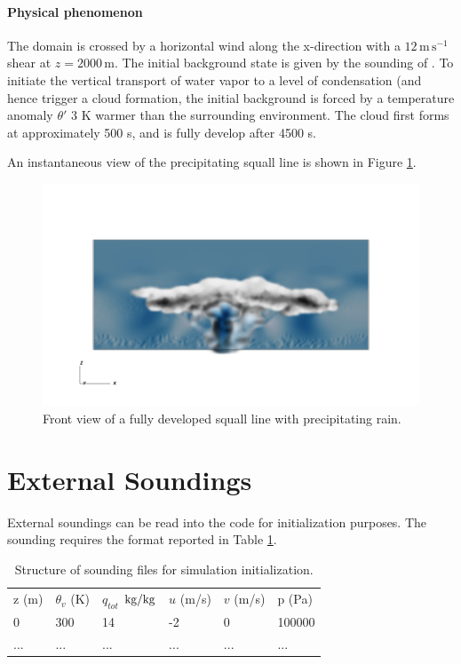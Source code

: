 \documentclass{report}
\begin{document}
\paragraph{Physical phenomenon}
The domain is crossed by a horizontal wind along the x-direction with a $12\,\mathrm{m\,s^{-1}}$ shear at $z=2000\,\mathrm{m}$.
The initial background state is given by the sounding of \cite{gabersekGiraldoDoyle2012}.
To initiate the vertical transport of water vapor to a level of condensation (and hence trigger a cloud formation, the initial background is forced by a temperature anomaly $\theta'$ $3$ K warmer than the surrounding environment. The cloud first forms at approximately 500 s, and is fully develop after 4500 s. 

An instantaneous view of the precipitating squall line is shown in Figure \ref{fig:benchmarks/squall1}. 

\begin{figure}[htbp]
\includegraphics[width=1.2\textwidth]{figures/squall_working_warm_rain_frontal_view0028.png}
\caption{Front view of a fully developed squall line with precipitating rain. }
\label{fig:benchmarks/squall1}
\end{figure}

\section{External Soundings}
External soundings can be read into the code for initialization purposes. The sounding requires the format reported in Table \ref{tab:DeltaDefinitionsTable}.

\begin{table}[t]
\centering
{\footnotesize
\caption[short]{Structure of sounding files for simulation initialization.}
\label{tab:DeltaDefinitionsTable}
\begin{tabular*}{\textwidth}{ @{\extracolsep{\fill}} llllll}
\hline
\hline
z (m) & $\theta_v$ (K) & $q_{tot}$ $\rm {kg/kg}$ & $u$ (m/s) & $v$ (m/s) & p (Pa)\\
0 & 300 & 14  & -2 & 0 & 100000\\
... & ... & ...  & ... & ... & ...\\
\hline
\hline
\end{tabular*}
}
\end{table}
\end{document}
